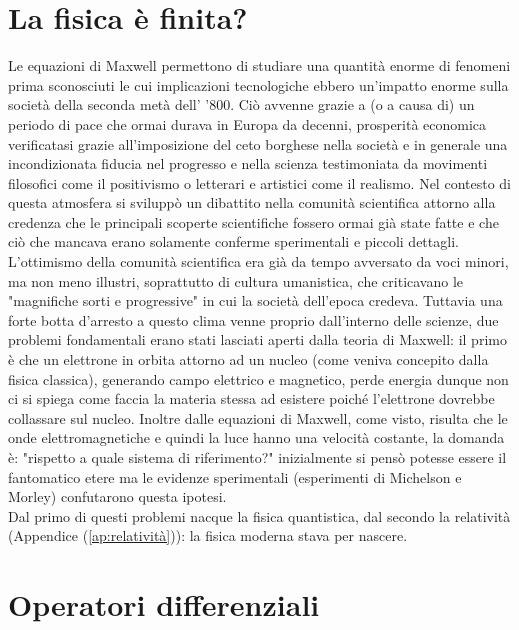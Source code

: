 \documentclass[
10pt, %
a4paper, %
oneside, %
headinclude,footinclude, %
BCOR5mm, %
]{scrartcl}
\begin{document}
\section{La fisica è finita?}
Le equazioni di Maxwell permettono di studiare una quantità enorme di fenomeni prima sconosciuti le cui implicazioni tecnologiche ebbero un'impatto enorme sulla società della seconda metà dell' '800. Ciò avvenne grazie a (o a causa di) un periodo di pace che ormai durava in Europa da decenni, prosperità economica verificatasi grazie all'imposizione del ceto borghese nella società e in generale una incondizionata fiducia nel progresso e nella scienza testimoniata da movimenti filosofici come il positivismo o letterari e artistici come il realismo. Nel contesto di questa atmosfera si sviluppò un dibattito nella comunità scientifica attorno alla credenza che le principali scoperte scientifiche fossero ormai già state fatte e che ciò che mancava erano solamente conferme sperimentali e piccoli dettagli. L'ottimismo della comunità scientifica era già da tempo avversato da voci minori, ma non meno illustri, soprattutto di cultura umanistica, che criticavano le "magnifiche sorti e progressive" in cui la società dell'epoca credeva. Tuttavia una forte botta d'arresto a questo clima venne proprio dall'interno delle scienze, due problemi fondamentali erano stati lasciati aperti dalla teoria di Maxwell: il primo è che un elettrone in orbita attorno ad un nucleo (come veniva concepito dalla fisica classica), generando campo elettrico e magnetico, perde energia dunque non ci si spiega come faccia la materia stessa ad esistere poiché l'elettrone dovrebbe collassare sul nucleo. Inoltre dalle equazioni di Maxwell, come visto, risulta che le onde elettromagnetiche e quindi la luce hanno una velocità costante, la domanda è: "rispetto a quale sistema di riferimento?" inizialmente si pensò potesse essere il fantomatico etere ma le evidenze sperimentali (esperimenti di Michelson e Morley) confutarono questa ipotesi.\\
Dal primo di questi problemi nacque la fisica quantistica, dal secondo la relatività (Appendice (\ref{ap:relatività})): la fisica moderna stava per nascere. 
\newpage
\appendix
\section{Operatori differenziali}\label{ap:operatori_differenziali}
\end{document}
